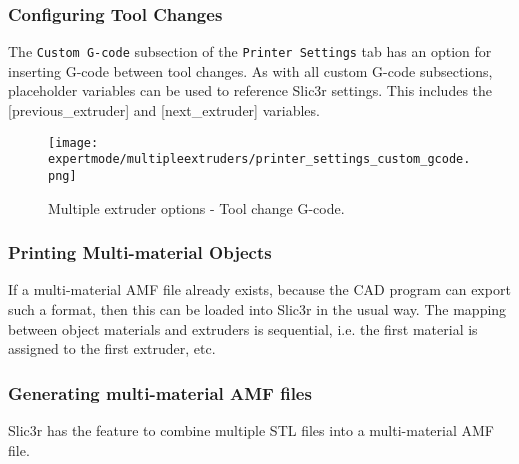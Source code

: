 
\subsubsection{Configuring Tool Changes} %
\label{sub:configuring_tool_changes}


The \texttt{Custom G-code} subsection of the \texttt{Printer Settings} tab has an option for inserting G-code between tool changes.  As with all custom G-code subsections, placeholder variables can be used to reference Slic3r settings.  This includes the [previous\_extruder] and [next\_extruder] variables.

\begin{figure}[H]
\centering
\texttt{[image: expertmode/multipleextruders/printer\_settings\_custom\_gcode.png]}
\caption{Multiple extruder options - Tool change G-code.}
\label{fig:printer_settings_custom_gcode}
\end{figure}



\subsubsection{Printing Multi-material Objects} %
\label{sub:printing_multi_material_objects}

If a multi-material AMF file already exists, because the CAD program can export such a format, then this can be loaded into Slic3r in the usual way.  The mapping between object materials and extruders is sequential, i.e. the first material is assigned to the first extruder, etc.



\subsubsection{Generating multi-material AMF files} %
\label{sub:generating_multi_material_amf_files}

Slic3r has the feature to combine multiple STL files into a multi-material AMF file.


